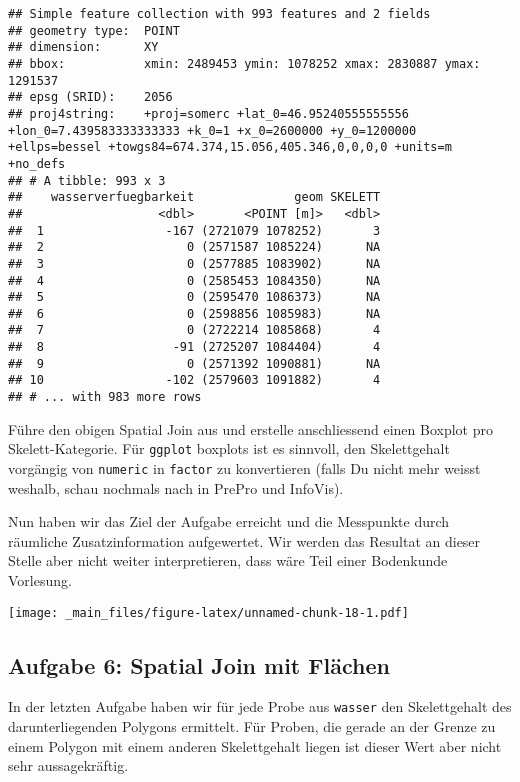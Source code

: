 \documentclass[]{book}
\begin{document}
\begin{verbatim}
## Simple feature collection with 993 features and 2 fields
## geometry type:  POINT
## dimension:      XY
## bbox:           xmin: 2489453 ymin: 1078252 xmax: 2830887 ymax: 1291537
## epsg (SRID):    2056
## proj4string:    +proj=somerc +lat_0=46.95240555555556 +lon_0=7.439583333333333 +k_0=1 +x_0=2600000 +y_0=1200000 +ellps=bessel +towgs84=674.374,15.056,405.346,0,0,0,0 +units=m +no_defs
## # A tibble: 993 x 3
##    wasserverfuegbarkeit              geom SKELETT
##                   <dbl>       <POINT [m]>   <dbl>
##  1                 -167 (2721079 1078252)       3
##  2                    0 (2571587 1085224)      NA
##  3                    0 (2577885 1083902)      NA
##  4                    0 (2585453 1084350)      NA
##  5                    0 (2595470 1086373)      NA
##  6                    0 (2598856 1085983)      NA
##  7                    0 (2722214 1085868)       4
##  8                  -91 (2725207 1084404)       4
##  9                    0 (2571392 1090881)      NA
## 10                 -102 (2579603 1091882)       4
## # ... with 983 more rows
\end{verbatim}

Führe den obigen Spatial Join aus und erstelle anschliessend einen Boxplot pro Skelett-Kategorie. Für \texttt{ggplot} boxplots ist es sinnvoll, den Skelettgehalt vorgängig von \texttt{numeric} in \texttt{factor} zu konvertieren (falls Du nicht mehr weisst weshalb, schau nochmals nach in PrePro und InfoVis).

Nun haben wir das Ziel der Aufgabe erreicht und die Messpunkte durch räumliche Zusatzinformation aufgewertet. Wir werden das Resultat an dieser Stelle aber nicht weiter interpretieren, dass wäre Teil einer Bodenkunde Vorlesung.

\texttt{[image: \_main\_files/figure-latex/unnamed-chunk-18-1.pdf]}

\hypertarget{aufgabe-6-spatial-join-mit-flachen}{%
\subsection{Aufgabe 6: Spatial Join mit Flächen}\label{aufgabe-6-spatial-join-mit-flachen}}

In der letzten Aufgabe haben wir für jede Probe aus \texttt{wasser} den Skelettgehalt des darunterliegenden Polygons ermittelt. Für Proben, die gerade an der Grenze zu einem Polygon mit einem anderen Skelettgehalt liegen ist dieser Wert aber nicht sehr aussagekräftig.
\end{document}
